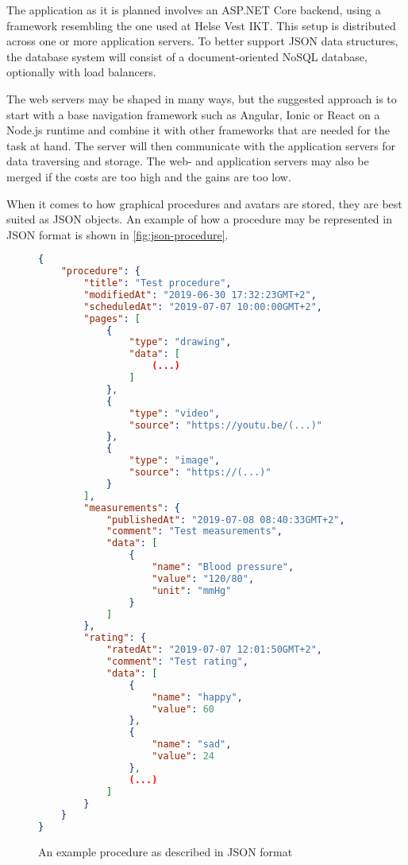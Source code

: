 The application as it is planned involves an ASP.NET Core backend, using a framework resembling the one used at Helse Vest IKT. This setup is distributed across one or more application servers. To better support JSON data structures, the database system will consist of a document-oriented NoSQL database, optionally with load balancers.

The web servers may be shaped in many ways, but the suggested approach is to start with a base navigation framework such as Angular, Ionic or React on a Node.js runtime and combine it with other frameworks that are needed for the task at hand. The server will then communicate with the application servers for data traversing and storage. The web- and application servers may also be merged if the costs are too high and the gains are too low.

When it comes to how graphical procedures and avatars are stored, they are best suited as JSON objects. An example of how a procedure may be represented in JSON format is shown in \autoref{fig:json-procedure}.

\begin{figure}
    \begin{lstlisting}[language=json]
{
    "procedure": {
        "title": "Test procedure",
        "modifiedAt": "2019-06-30 17:32:23GMT+2",
        "scheduledAt": "2019-07-07 10:00:00GMT+2",
        "pages": [
            {
                "type": "drawing",
                "data": [
                    (...)
                ]
            },
            {
                "type": "video",
                "source": "https://youtu.be/(...)"
            },
            {
                "type": "image",
                "source": "https://(...)"
            }
        ],
        "measurements": {
            "publishedAt": "2019-07-08 08:40:33GMT+2",
            "comment": "Test measurements",
            "data": [
                {
                    "name": "Blood pressure",
                    "value": "120/80",
                    "unit": "mmHg"
                }
            ]
        },
        "rating": {
            "ratedAt": "2019-07-07 12:01:50GMT+2",
            "comment": "Test rating",
            "data": [
                {
                    "name": "happy",
                    "value": 60
                },
                {
                    "name": "sad",
                    "value": 24
                },
                (...)
            ]
        }
    }
}
    \end{lstlisting}
    \caption{An example procedure as described in JSON format}
    \label{fig:json-procedure}
\end{figure}

